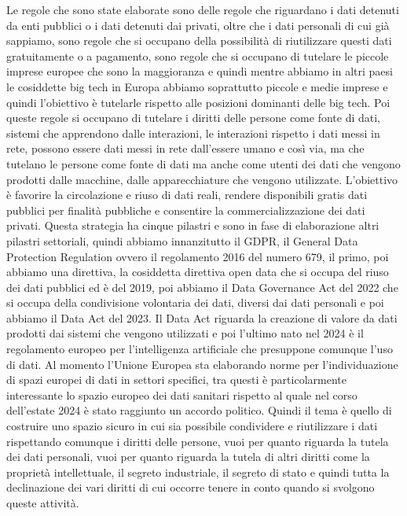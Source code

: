 Le regole che sono state elaborate sono delle regole che riguardano i dati detenuti da enti pubblici o i dati detenuti dai privati, oltre che i dati personali di cui già sappiamo, sono regole che si occupano della possibilità di riutilizzare questi dati gratuitamente o a pagamento, sono regole che si occupano di tutelare le piccole imprese europee che sono la maggioranza e quindi mentre abbiamo in altri paesi le cosiddette big tech in Europa abbiamo soprattutto piccole e medie imprese e quindi l'obiettivo è tutelarle rispetto alle posizioni dominanti delle big tech. Poi queste regole si occupano  di tutelare i diritti delle persone come fonte di dati, sistemi che apprendono dalle interazioni, le interazioni  rispetto i dati messi in rete, possono essere dati messi in rete dall'essere umano e così via, ma che tutelano le persone come fonte di dati ma anche come utenti dei dati che vengono prodotti dalle macchine, dalle apparecchiature che vengono utilizzate.
L'obiettivo è favorire la circolazione e riuso di dati reali, rendere disponibili gratis dati pubblici per finalità pubbliche e consentire la commercializzazione dei dati privati.
Questa strategia ha cinque pilastri e sono in fase di elaborazione altri pilastri settoriali, quindi abbiamo innanzitutto il GDPR, il General Data Protection Regulation ovvero il regolamento 2016 del numero 679, il primo, poi abbiamo una direttiva, la cosiddetta direttiva open data che si occupa del riuso dei dati pubblici ed è del 2019, poi abbiamo il Data Governance Act del 2022 che si occupa della condivisione volontaria dei dati, diversi dai dati personali e poi abbiamo il Data Act del 2023.
Il Data Act riguarda la creazione di valore da dati prodotti dai sistemi che vengono utilizzati e poi l'ultimo nato nel 2024 è il regolamento europeo per l'intelligenza artificiale che presuppone comunque l'uso di dati.
Al momento l'Unione Europea sta elaborando norme per l'individuazione di spazi europei di dati in settori specifici, tra questi è particolarmente interessante lo spazio europeo dei dati sanitari rispetto al quale nel corso dell'estate 2024 è stato raggiunto un accordo politico. Quindi il tema è quello di costruire uno spazio sicuro in cui sia possibile condividere e riutilizzare i dati rispettando comunque i diritti delle persone, vuoi per quanto riguarda la tutela dei dati personali, vuoi per quanto riguarda la tutela di altri diritti come la proprietà intellettuale, il segreto industriale, il segreto di stato e quindi tutta la declinazione dei vari diritti di cui occorre tenere in conto quando si svolgono queste attività.


